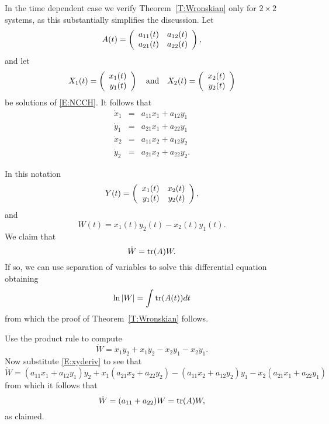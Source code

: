 \documentclass{ximera}
\begin{document}
In the time dependent case we verify Theorem~\ref{T:Wronskian} only 
for $2\times 2$ systems, as this 
substantially simplifies the discussion.   Let 
\[
A(t) = \left(\begin{array}{rr} a_{11}(t) & a_{12}(t)\\ a_{21}(t) &a_{22}(t)\end{array}\right),
\]
and let 
\[
X_1(t) = \left(\begin{array}{r} x_1(t) \\ y_1(t)\end{array}\right) \quad\mbox{and}\quad  X_2(t) = \left(\begin{array}{r} x_2(t) \\ y_2(t)\end{array}\right)
\]
be solutions of \eqref{E:NCCH}.  It follows that 
\begin{equation}   \label{E:xyderiv}
\begin{array}{rcl}
\dot{x}_1 & = & a_{11}x_1 + a_{12}y_1 \\
\dot{y}_1 & = & a_{21}x_1 + a_{22}y_1 \\
\dot{x}_2 & = & a_{11}x_2 + a_{12}y_2 \\
\dot{y}_2 & = & a_{21}x_2 + a_{22}y_2.
\end{array}
\end{equation}

In this notation 
\[
Y(t) = \left(\begin{array}{rr} x_1(t) & x_2(t)\\ y_1(t) &y_2(t)\end{array}\right),
\]
and
\[
W(t) = x_1(t)y_2(t) - x_2(t)y_1(t).
\]
We claim that 
\[
\dot{W} = {\rm tr}(A) W.
\]
If so, we can use separation of variables to solve this differential equation 
obtaining
\[
\ln |W| = \int {\rm tr}(A(t))dt 
\]
from which the proof of Theorem~\ref{T:Wronskian} follows.

Use the product rule to compute
\[
\dot{W}  =  \dot{x}_1y_2 + x_1\dot{y}_2 - \dot{x}_2y_1 - x_2\dot{y}_1.
\]
Now substitute \eqref{E:xyderiv} to see that 
\[
\dot{W} = (a_{11}x_1 + a_{12}y_1)y_2 + x_1(a_{21}x_2 + a_{22}y_2)
- (a_{11}x_2 + a_{12}y_2)y_1 - x_2(a_{21}x_1 + a_{22}y_1)
\]
from which it follows that 
\[
\dot{W} = (a_{11}+a_{22})W = {\rm tr}(A)W,
\]
as claimed.


\EXER


 
\end{document}
